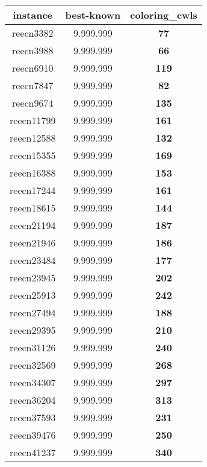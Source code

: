 \begin{tabular}{cc||c}
instance & best-known & coloring\_cwls \\ 
 \hline 
reecn3382        & 9.999.999        & {\bf 77}        \\ 
reecn3988        & 9.999.999        & {\bf 66}        \\ 
reecn6910        & 9.999.999        & {\bf 119}       \\ 
reecn7847        & 9.999.999        & {\bf 82}        \\ 
reecn9674        & 9.999.999        & {\bf 135}       \\ 
reecn11799       & 9.999.999        & {\bf 161}       \\ 
reecn12588       & 9.999.999        & {\bf 132}       \\ 
reecn15355       & 9.999.999        & {\bf 169}       \\ 
reecn16388       & 9.999.999        & {\bf 153}       \\ 
reecn17244       & 9.999.999        & {\bf 161}       \\ 
reecn18615       & 9.999.999        & {\bf 144}       \\ 
reecn21194       & 9.999.999        & {\bf 187}       \\ 
reecn21946       & 9.999.999        & {\bf 186}       \\ 
reecn23484       & 9.999.999        & {\bf 177}       \\ 
reecn23945       & 9.999.999        & {\bf 202}       \\ 
reecn25913       & 9.999.999        & {\bf 242}       \\ 
reecn27494       & 9.999.999        & {\bf 188}       \\ 
reecn29395       & 9.999.999        & {\bf 210}       \\ 
reecn31126       & 9.999.999        & {\bf 240}       \\ 
reecn32569       & 9.999.999        & {\bf 268}       \\ 
reecn34307       & 9.999.999        & {\bf 297}       \\ 
reecn36204       & 9.999.999        & {\bf 313}       \\ 
reecn37593       & 9.999.999        & {\bf 231}       \\ 
reecn39476       & 9.999.999        & {\bf 250}       \\ 
reecn41237       & 9.999.999        & {\bf 340}       \\ 

\end{tabular}
